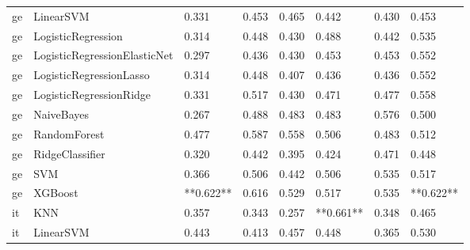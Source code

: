 \begin{tabular}{llllllll}
      ge &                    LinearSVM &     0.331 &                     0.453 &                 0.465 &                  0.442 &                                   0.430 &     0.453 \\
      ge &           LogisticRegression &     0.314 &                     0.448 &                 0.430 &                  0.488 &                                   0.442 &     0.535 \\
      ge & LogisticRegressionElasticNet &     0.297 &                     0.436 &                 0.430 &                  0.453 &                                   0.453 &     0.552 \\
      ge &      LogisticRegressionLasso &     0.314 &                     0.448 &                 0.407 &                  0.436 &                                   0.436 &     0.552 \\
      ge &      LogisticRegressionRidge &     0.331 &                     0.517 &                 0.430 &                  0.471 &                                   0.477 &     0.558 \\
      ge &                   NaiveBayes &     0.267 &                     0.488 &                 0.483 &                  0.483 &                                   0.576 &     0.500 \\
      ge &                 RandomForest &     0.477 &                     0.587 &                 0.558 &                  0.506 &                                   0.483 &     0.512 \\
      ge &              RidgeClassifier &     0.320 &                     0.442 &                 0.395 &                  0.424 &                                   0.471 &     0.448 \\
      ge &                          SVM &     0.366 &                     0.506 &                 0.442 &                  0.506 &                                   0.535 &     0.517 \\
      ge &                      XGBoost & **0.622** &                     0.616 &                 0.529 &                  0.517 &                                   0.535 & **0.622** \\
      it &                          KNN &     0.357 &                     0.343 &                 0.257 &              **0.661** &                                   0.348 &     0.465 \\
      it &                    LinearSVM &     0.443 &                     0.413 &                 0.457 &                  0.448 &                                   0.365 &     0.530 \\

\end{tabular}
